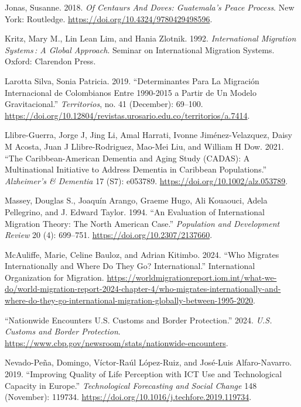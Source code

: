 \documentclass[
]{article}
\newlength{\cslhangindent}
\newenvironment{CSLReferences}[2] %
 {\begin{list}{}{%
  \setlength{\itemindent}{0pt}
  \setlength{\leftmargin}{0pt}
  \setlength{\parsep}{0pt}
  \ifodd #1
   \setlength{\leftmargin}{\cslhangindent}
   \setlength{\itemindent}{-1\cslhangindent}
  \fi
  \setlength{\itemsep}{#2\baselineskip}}}
 {\end{list}}
\begin{document}
\begin{CSLReferences}{1}{0}
Jonas, Susanne. 2018. \emph{Of {Centaurs} {And} {Doves}: {Guatemala}'s
{Peace} {Process}}. New York: Routledge.
\url{https://doi.org/10.4324/9780429498596}.

Kritz, Mary M., Lin Lean Lim, and Hania Zlotnik. 1992.
\emph{International {Migration} {Systems}\,: {A} {Global} {Approach}}.
Seminar on {International} {Migration} {Systems}. Oxford: Clarendon
Press.

Larotta Silva, Sonia Patricia. 2019. {``Determinantes Para La Migración
Internacional de Colombianos Entre 1990-2015 a Partir de Un Modelo
Gravitacional.''} \emph{Territorios}, no. 41 (December): 69--100.
\url{https://doi.org/10.12804/revistas.urosario.edu.co/territorios/a.7414}.

Llibre-Guerra, Jorge J, Jing Li, Amal Harrati, Ivonne Jiménez-Velazquez,
Daisy M Acosta, Juan J Llibre-Rodriguez, Mao-Mei Liu, and William H Dow.
2021. {``The {Caribbean}-{American} {Dementia} and {Aging} {Study}
({CADAS}): {A} Multinational Initiative to Address Dementia in
{Caribbean} Populations.''} \emph{Alzheimer's \& Dementia} 17 (S7):
e053789. \url{https://doi.org/10.1002/alz.053789}.

Massey, Douglas S., Joaquín Arango, Graeme Hugo, Ali Kouaouci, Adela
Pellegrino, and J. Edward Taylor. 1994. {``An {Evaluation} of
{International} {Migration} {Theory}: {The} {North} {American}
{Case}.''} \emph{Population and Development Review} 20 (4): 699--751.
\url{https://doi.org/10.2307/2137660}.

McAuliffe, Marie, Celine Bauloz, and Adrian Kitimbo. 2024. {``Who
Migrates Internationally and Where Do They Go? {International}.''}
International Organization for Migration.
\url{https://worldmigrationreport.iom.int/what-we-do/world-migration-report-2024-chapter-4/who-migrates-internationally-and-where-do-they-go-international-migration-globally-between-1995-2020}.

{``Nationwide {Encounters} {\textbar} {U}.{S}. {Customs} and {Border}
{Protection}.''} 2024. \emph{U.S. Customs and Border Protection}.
\url{https://www.cbp.gov/newsroom/stats/nationwide-encounters}.

Nevado-Peña, Domingo, Víctor-Raúl López-Ruiz, and José-Luis
Alfaro-Navarro. 2019. {``Improving Quality of Life Perception with {ICT}
Use and Technological Capacity in {Europe}.''} \emph{Technological
Forecasting and Social Change} 148 (November): 119734.
\url{https://doi.org/10.1016/j.techfore.2019.119734}.


\end{CSLReferences}
\end{document}
